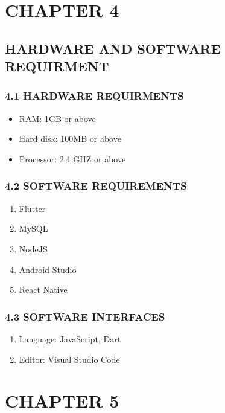 \documentclass[12pt,a4paper]{article}
\begin{document}
\newpage

\section*{CHAPTER 4}
\subsection*{\protect \centering HARDWARE AND SOFTWARE REQUIRMENT}

	\subsubsection*{ 4.1 HARDWARE REQUIRMENTS}
		\begin{itemize}
			\item RAM: 1GB or above
			\item Hard disk: 100MB or above
			\item Processor: 2.4 GHZ or above 
		\end{itemize}
		\subsubsection*{ 4.2 SOFTWARE REQUIREMENTS}
	\begin{enumerate}
		\item Flutter
		\item MySQL
		\item NodeJS
		\item Android Studio
		\item React Native
	\end{enumerate}
			\subsubsection*{4.3 SOFTWARE INTERFACES}
		\begin{enumerate}
		\item Language: JavaScript, Dart
		\item Editor: Visual Studio Code 
	\end{enumerate}

\newpage
\section*{CHAPTER 5}
\end{document}
